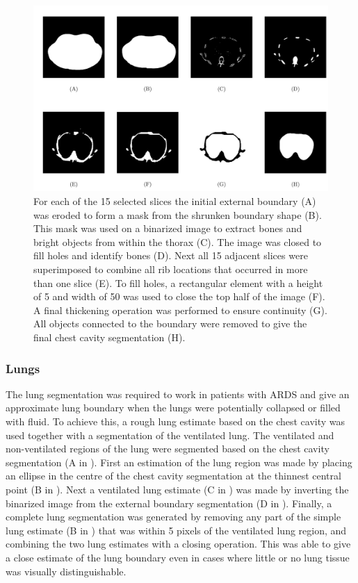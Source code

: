 \begin{figure}
	\centering
	\includegraphics[width=\textwidth]{chapter5-CT_to_mesh/imgs/chest_cavity_seg_methods.pdf}
	\caption[Chest cavity segmentation methods.]{\label{fig:cav_seg_methods}%
	For each of the 15 selected slices the initial external boundary (A)
	was eroded to form a mask from the shrunken boundary shape
	(B). This mask was used on a binarized image to extract bones and bright objects from
	within the thorax (C). The image was closed to fill  holes and identify bones
	(D). Next all 15 adjacent slices were superimposed to combine all rib locations
	that occurred in more than one slice (E).
	To fill holes, a rectangular element with a height of 5 and width of 50 was used to close 
	the top half of the image (F).
	A final thickening operation was performed to ensure continuity
	(G). All objects connected to the boundary were removed 
	to give the final chest cavity segmentation (H).
	}
\end{figure}


\subsubsection{Lungs}
The lung segmentation was required to work in patients with ARDS and give 
an approximate lung boundary when the lungs were potentially collapsed or filled with 
fluid. To achieve this, a rough lung estimate based on the chest cavity  
was used together with a segmentation of the 
ventilated lung.
The ventilated and non-ventilated regions of the lung were segmented based 
on the chest cavity segmentation (A in ).
First an estimation of the lung region was made by placing an ellipse
in the centre of the chest cavity segmentation at the thinnest central
point (B in ). Next a ventilated lung estimate 
(C in )
was made
by inverting the binarized image from the external boundary segmentation
(D in ). 
Finally, a complete lung segmentation was generated by removing any part of the
simple lung estimate (B in ) that was within 5 
pixels of the ventilated lung region, and combining the two 
lung estimates with a closing operation. 
This was able to give a close estimate of the lung boundary even in cases where
little or no lung tissue was visually distinguishable. 

